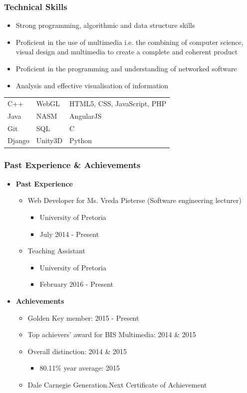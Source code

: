 \documentclass{article}
\begin{document}
	\subsubsection{Technical Skills}
		\begin{itemize}
			\item Strong programming, algorithmic and data structure skills
			\item Proficient in the use of multimedia i.e. the combining of computer science, visual design and multimedia to create a complete and coherent product
			\item Proficient in the programming and understanding of networked software
			\item Analysis and effective visualisation of information
		\end{itemize}
		\begin{tabular}{| l | l | l |}
			C++		& WebGL		& HTML5, CSS, JavaScript, PHP   	\\
			Java    & NASM     	& AngularJS							\\
			Git 	& SQL     	& C									\\
			Django 	& Unity3D 	& Python                     
		\end{tabular}
		
	\subsubsection{Past Experience \& Achievements}
		\begin{itemize}
			\item \textbf{Past Experience}
			\begin{itemize}
				\item Web Developer for Ms. Vreda Pieterse (Software engineering lecturer)
				\begin{itemize}
					\item University of Pretoria
					\item July 2014 - Present
				\end{itemize}
				\item Teaching Assistant
				\begin{itemize}
					\item University of Pretoria
					\item February 2016 - Present
				\end{itemize}
			\end{itemize}
			
			\item \textbf{Achievements}
			\begin{itemize}
				\item Golden Key member: 2015 - Present
				\item Top achievers' award for BIS Multimedia: 2014 \& 2015
				\item Overall distinction: 2014 \& 2015
				\begin{itemize}
					\item 80.11\% year average: 2015
				\end{itemize}
				\item Dale Carnegie Generation.Next Certificate of Achievement
			\end{itemize}
		\end{itemize}
		
\end{document}
